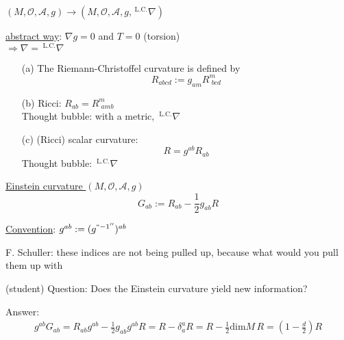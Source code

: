 $(M,\mathcal{O}, \mathcal{A},g) \to (M,\mathcal{O}, \mathcal{A}, g, {\,}^{\text{L.C.}}\nabla)$

\underline{abstract way}: $\nabla g = 0$ and $T=0$ (torsion) \\
$\Longrightarrow \nabla = {\,}^{\text{L.C.}}\nabla$


\begin{definition}
\begin{enumerate}
\item[(a)]
  The Riemann-Christoffel curvature is defined by 
\[
R_{abcd} := g_{am}R^m_{\,\,bcd}
\]
\item[(b)] Ricci: $R_{ab} = R^m_{\,\,amb}$ \\
Thought bubble: with a metric, ${\,}^{\text{L.C.}}\nabla$
\item[(c)] (Ricci) scalar curvature:
\[
R = g^{ab} R_{ab}
\]
Thought bubble: ${\,}^{\text{L.C.}}\nabla$
\end{enumerate}
\end{definition}

\begin{definition}
 \underline{ Einstein curvature } $(M,\mathcal{O}, \mathcal{A},g)$
\[
G_{ab}:= R_{ab} - \frac{1}{2} g_{ab} R
\]
\end{definition}

\underline{Convention}: $g^{ab} := (g^{``-1''})^{ab}$

F. Schuller: these indices are not being pulled up, because what would you pull them up with

(student) Question: Does the Einstein curvature yield new information?

Answer: 
\[
\begin{gathered}
  g^{ab} G_{ab} = R_{ab} g^{ab} - \frac{1}{2} g_{ab} g^{ab} R = R - \delta^a_a R = R - \frac{1}{2} \text{dim}M \, R = (1- \frac{d}{2}) R
\end{gathered}
\]

